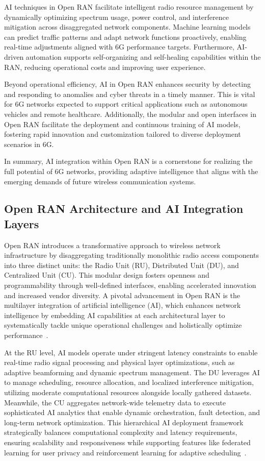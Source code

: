 \documentclass[sigconf]{acmart}
\begin{document}
AI techniques in Open RAN facilitate intelligent radio resource management by dynamically optimizing spectrum usage, power control, and interference mitigation across disaggregated network components. Machine learning models can predict traffic patterns and adapt network functions proactively, enabling real-time adjustments aligned with 6G performance targets. Furthermore, AI-driven automation supports self-organizing and self-healing capabilities within the RAN, reducing operational costs and improving user experience.

Beyond operational efficiency, AI in Open RAN enhances security by detecting and responding to anomalies and cyber threats in a timely manner. This is vital for 6G networks expected to support critical applications such as autonomous vehicles and remote healthcare. Additionally, the modular and open interfaces in Open RAN facilitate the deployment and continuous training of AI models, fostering rapid innovation and customization tailored to diverse deployment scenarios in 6G.

In summary, AI integration within Open RAN is a cornerstone for realizing the full potential of 6G networks, providing adaptive intelligence that aligns with the emerging demands of future wireless communication systems.

\subsection{Open RAN Architecture and AI Integration Layers}

Open RAN introduces a transformative approach to wireless network infrastructure by disaggregating traditionally monolithic radio access components into three distinct units: the Radio Unit (RU), Distributed Unit (DU), and Centralized Unit (CU). This modular design fosters openness and programmability through well-defined interfaces, enabling accelerated innovation and increased vendor diversity. A pivotal advancement in Open RAN is the multilayer integration of artificial intelligence (AI), which enhances network intelligence by embedding AI capabilities at each architectural layer to systematically tackle unique operational challenges and holistically optimize performance~\cite{ref54}.

At the RU level, AI models operate under stringent latency constraints to enable real-time radio signal processing and physical layer optimizations, such as adaptive beamforming and dynamic spectrum management. The DU leverages AI to manage scheduling, resource allocation, and localized interference mitigation, utilizing moderate computational resources alongside locally gathered datasets. Meanwhile, the CU aggregates network-wide telemetry data to execute sophisticated AI analytics that enable dynamic orchestration, fault detection, and long-term network optimization. This hierarchical AI deployment framework strategically balances computational complexity and latency requirements, ensuring scalability and responsiveness while supporting features like federated learning for user privacy and reinforcement learning for adaptive scheduling~\cite{ref54}.
\end{document}
